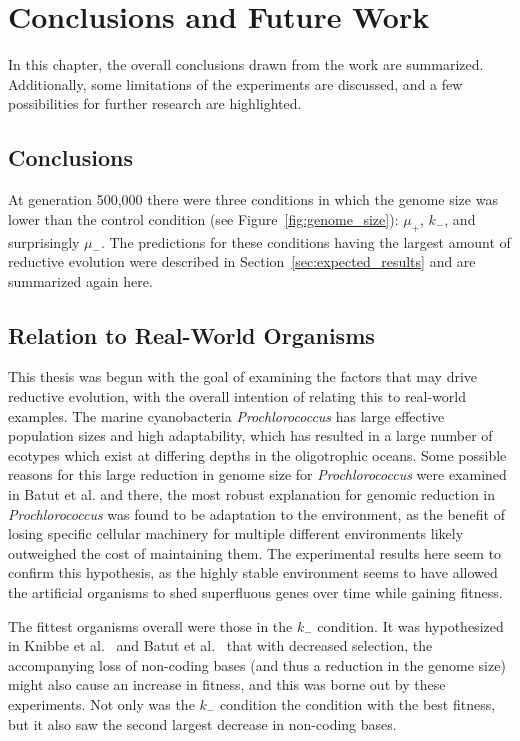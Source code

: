 
\chapter{Conclusions and Future Work}\label{ch:05conclusion}
In this chapter, the overall conclusions drawn from the work are summarized. Additionally, some limitations of the experiments are discussed, and a few possibilities for further research are highlighted.

\section{Conclusions}
At generation 500,000 there were three conditions in which the genome size was lower than the control condition (see Figure~\ref{fig:genome_size}): $\mu_+$, $k_-$, and surprisingly $\mu_-$. The predictions for these conditions having the largest amount of reductive evolution were described in Section~\ref{sec:expected_results} and are summarized again here. 

\section{Relation to Real-World Organisms}

This thesis was begun with the goal of examining the factors that may drive reductive evolution, with the overall intention of relating this to real-world examples. The marine cyanobacteria \textit{Prochlorococcus} has large effective population sizes and high adaptability, which has resulted in a large number of ecotypes which exist at differing depths in the oligotrophic oceans. Some possible reasons for this large reduction in genome size for \textit{Prochlorococcus} were examined in Batut et al.\cite{Batut.2014} and there, the most robust explanation for genomic reduction in \textit{Prochlorococcus} was found to be adaptation to the environment, as the benefit of losing specific cellular machinery for multiple different environments likely outweighed the cost of maintaining them. The experimental results here seem to confirm this hypothesis, as the highly stable environment seems to have allowed the artificial organisms to shed superfluous genes over time while gaining fitness. 

The fittest organisms overall were those in the $k_-$ condition. It was hypothesized in Knibbe et al.~\cite{Knibbe2007} and Batut et al.~\cite{Batut.2013} that with decreased selection, the accompanying loss of non-coding bases (and thus a reduction in the genome size) might also cause an increase in fitness, and this was borne out by these experiments. Not only was the $k_-$ condition the condition with the best fitness, but it also saw the second largest decrease in non-coding bases. 
  
